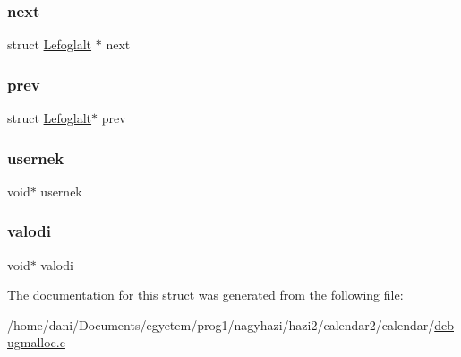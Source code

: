 \mbox{\label{struct_lefoglalt_adc30abdfb5e692e2c216e3673d0d19b9}} 
\subsubsection{\texorpdfstring{next}{next}}
{\footnotesize\ttfamily struct \hyperlink{struct_lefoglalt}{Lefoglalt} $\ast$ next}

\mbox{\label{struct_lefoglalt_a2b1e290e1bec4c24cb7ec2aaf8747687}} 
\subsubsection{\texorpdfstring{prev}{prev}}
{\footnotesize\ttfamily struct \hyperlink{struct_lefoglalt}{Lefoglalt}$\ast$ prev}

\mbox{\label{struct_lefoglalt_a58c09d4017310a90fad327e926330b96}} 
\subsubsection{\texorpdfstring{usernek}{usernek}}
{\footnotesize\ttfamily void$\ast$ usernek}

\mbox{\label{struct_lefoglalt_a59522ad17870bd526fae5bbbc8125966}} 
\subsubsection{\texorpdfstring{valodi}{valodi}}
{\footnotesize\ttfamily void$\ast$ valodi}



The documentation for this struct was generated from the following file\+:\begin{DoxyCompactItemize}
\item 
/home/dani/\+Documents/egyetem/prog1/nagyhazi/hazi2/calendar2/calendar/\hyperlink{debugmalloc_8c}{debugmalloc.\+c}\end{DoxyCompactItemize}

